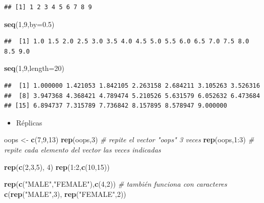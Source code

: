 \documentclass[]{article}
\def\tightlist{}
\newenvironment{Shaded}{\begin{snugshade}}{\end{snugshade}}
\newcommand{\KeywordTok}[1]{\textcolor[rgb]{0.13,0.29,0.53}{\textbf{{#1}}}}
\newcommand{\DataTypeTok}[1]{\textcolor[rgb]{0.13,0.29,0.53}{{#1}}}
\newcommand{\DecValTok}[1]{\textcolor[rgb]{0.00,0.00,0.81}{{#1}}}
\newcommand{\FloatTok}[1]{\textcolor[rgb]{0.00,0.00,0.81}{{#1}}}
\newcommand{\StringTok}[1]{\textcolor[rgb]{0.31,0.60,0.02}{{#1}}}
\newcommand{\CommentTok}[1]{\textcolor[rgb]{0.56,0.35,0.01}{\textit{{#1}}}}
\newcommand{\NormalTok}[1]{{#1}}
\numberwithin{equation}{section}
\begin{document}
\begin{verbatim}
## [1] 1 2 3 4 5 6 7 8 9
\end{verbatim}

\begin{Shaded}
\begin{Highlighting}[]
\KeywordTok{seq}\NormalTok{(}\DecValTok{1}\NormalTok{,}\DecValTok{9}\NormalTok{,}\DataTypeTok{by=}\FloatTok{0.5}\NormalTok{)}
\end{Highlighting}
\end{Shaded}

\begin{verbatim}
##  [1] 1.0 1.5 2.0 2.5 3.0 3.5 4.0 4.5 5.0 5.5 6.0 6.5 7.0 7.5 8.0 8.5 9.0
\end{verbatim}

\begin{Shaded}
\begin{Highlighting}[]
\KeywordTok{seq}\NormalTok{(}\DecValTok{1}\NormalTok{,}\DecValTok{9}\NormalTok{,}\DataTypeTok{length=}\DecValTok{20}\NormalTok{)}
\end{Highlighting}
\end{Shaded}

\begin{verbatim}
##  [1] 1.000000 1.421053 1.842105 2.263158 2.684211 3.105263 3.526316
##  [8] 3.947368 4.368421 4.789474 5.210526 5.631579 6.052632 6.473684
## [15] 6.894737 7.315789 7.736842 8.157895 8.578947 9.000000
\end{verbatim}

\begin{itemize}
\tightlist
\item
  Réplicas
\end{itemize}

\begin{Shaded}
\begin{Highlighting}[]
\NormalTok{oops <-}\StringTok{ }\KeywordTok{c}\NormalTok{(}\DecValTok{7}\NormalTok{,}\DecValTok{9}\NormalTok{,}\DecValTok{13}\NormalTok{)}
\KeywordTok{rep}\NormalTok{(oops,}\DecValTok{3}\NormalTok{) }\CommentTok{# repite el vector "oops" 3 veces}
\KeywordTok{rep}\NormalTok{(oops,}\DecValTok{1}\NormalTok{:}\DecValTok{3}\NormalTok{) }\CommentTok{# repite cada elemento del vector las veces indicadas}

\KeywordTok{rep}\NormalTok{(}\KeywordTok{c}\NormalTok{(}\DecValTok{2}\NormalTok{,}\DecValTok{3}\NormalTok{,}\DecValTok{5}\NormalTok{), }\DecValTok{4}\NormalTok{)}
\KeywordTok{rep}\NormalTok{(}\DecValTok{1}\NormalTok{:}\DecValTok{2}\NormalTok{,}\KeywordTok{c}\NormalTok{(}\DecValTok{10}\NormalTok{,}\DecValTok{15}\NormalTok{))}

\KeywordTok{rep}\NormalTok{(}\KeywordTok{c}\NormalTok{(}\StringTok{"MALE"}\NormalTok{,}\StringTok{"FEMALE"}\NormalTok{),}\KeywordTok{c}\NormalTok{(}\DecValTok{4}\NormalTok{,}\DecValTok{2}\NormalTok{)) }\CommentTok{# también funciona con caracteres}
\KeywordTok{c}\NormalTok{(}\KeywordTok{rep}\NormalTok{(}\StringTok{"MALE"}\NormalTok{,}\DecValTok{3}\NormalTok{), }\KeywordTok{rep}\NormalTok{(}\StringTok{"FEMALE"}\NormalTok{,}\DecValTok{2}\NormalTok{))}
\end{Highlighting}
\end{Shaded}
\end{document}
